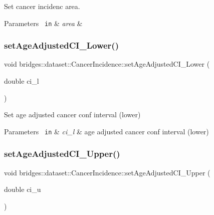 Set cancer incidenc area. 


\begin{DoxyParams}[1]{Parameters}
\mbox{\texttt{ in}}  & {\em area} & \\
\hline
\end{DoxyParams}
\mbox{\label{classbridges_1_1dataset_1_1_cancer_incidence_ac747ae48aa5619cb41d8296420eb3925}} 
\subsubsection{\texorpdfstring{setAgeAdjustedCI\_Lower()}{setAgeAdjustedCI\_Lower()}}
{\footnotesize\ttfamily void bridges\+::dataset\+::\+Cancer\+Incidence\+::set\+Age\+Adjusted\+C\+I\+\_\+\+Lower (\begin{DoxyParamCaption}\item[{double}]{ci\+\_\+l }\end{DoxyParamCaption})\hspace{0.3cm}{\ttfamily [inline]}}

Set age adjusted cancer conf interval (lower)


\begin{DoxyParams}[1]{Parameters}
\mbox{\texttt{ in}}  & {\em ci\+\_\+l} & age adjusted cancer conf interval (lower) \\
\hline
\end{DoxyParams}
\mbox{\label{classbridges_1_1dataset_1_1_cancer_incidence_a7cece904f540224984518679bc4ae544}} 
\subsubsection{\texorpdfstring{setAgeAdjustedCI\_Upper()}{setAgeAdjustedCI\_Upper()}}
{\footnotesize\ttfamily void bridges\+::dataset\+::\+Cancer\+Incidence\+::set\+Age\+Adjusted\+C\+I\+\_\+\+Upper (\begin{DoxyParamCaption}\item[{double}]{ci\+\_\+u }\end{DoxyParamCaption})\hspace{0.3cm}{\ttfamily [inline]}}


